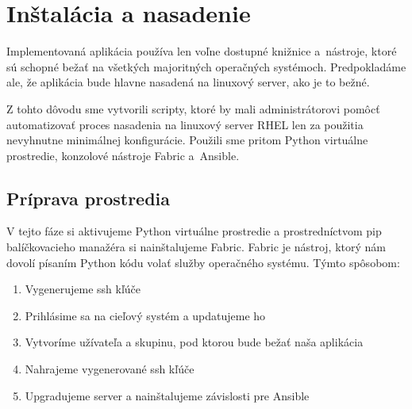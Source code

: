 \chapter{Inštalácia a nasadenie}
Implementovaná aplikácia používa len voľne dostupné knižnice a~nás\-troje, ktoré sú schopné bežať na všetkých majoritných operačných systémoch. Predpokladáme ale, že aplikácia bude hlavne nasadená na linuxový server, ako je to bežné. 
\par Z tohto dôvodu sme vytvorili scripty, ktoré by mali administrátorovi pomôcť automatizovať proces nasadenia na linuxový server RHEL len za použitia nevyhnutne minimálnej konfigurácie. Použili sme pritom Python virtuálne prostredie, konzolové nástroje Fabric a~Ansible.

\section{Príprava prostredia}
V tejto fáze si aktivujeme Python virtuálne prostredie a prostredníctvom pip balíčkovacieho manažéra si nainštalujeme Fabric.
Fabric je nástroj, ktorý nám dovolí písaním Python kódu volať služby ope\-račného systému. Týmto spôsobom: 

\begin{enumerate}
  \item Vygenerujeme ssh kľúče
  \item Prihlásime sa na cieľový systém a updatujeme ho
  \item Vytvoríme užívateľa a skupinu, pod ktorou bude bežať naša aplikácia
  \item Nahrajeme vygenerované ssh kľúče
  \item Upgradujeme server a nainštalujeme závislosti pre Ansible
\end{enumerate}
